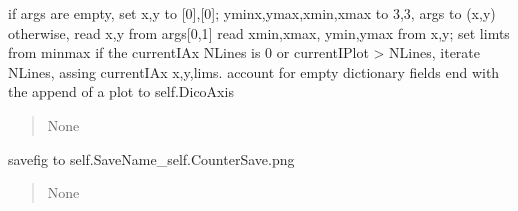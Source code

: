 \documentclass[letterpaper,10pt,english]{sphinxmanual}
\begin{document}
\begin{fulllineitems}
\begin{fulllineitems}
\begin{quote}
\begin{description}
\end{description}\end{quote}

\end{fulllineitems}


\begin{fulllineitems}
\label{\detokenize{api/killMS.Plot:killMS.Plot.Graph.ClassMplWidget.plot}}
\pysigstartsignatures
{}
\pysigstopsignatures
\sphinxAtStartPar
if args are empty, set x,y to {[}0{]},{[}0{]}; yminx,ymax,xmin,xmax to \sphinxhyphen{}3,3, args to (x,y)
otherwise, read x,y from args{[}0,1{]}
read xmin,xmax, ymin,ymax from x,y; set limts from minmax
if the currentIAx NLines is 0 or currentIPlot \textgreater{} NLines,
iterate NLines, assing currentIAx x,y,lims.
account for empty dictionary fields
end with the append of a plot to self.DicoAxis
\begin{quote}\begin{description}
\sphinxAtStartPar
None

\end{description}\end{quote}

\end{fulllineitems}


\begin{fulllineitems}
\label{\detokenize{api/killMS.Plot:killMS.Plot.Graph.ClassMplWidget.savefig}}
\pysigstartsignatures
{}
\pysigstopsignatures
\sphinxAtStartPar
savefig to self.SaveName\_self.CounterSave.png
\begin{quote}\begin{description}
\sphinxAtStartPar
None

\end{description}\end{quote}

\end{fulllineitems}


\end{fulllineitems}
\end{document}
